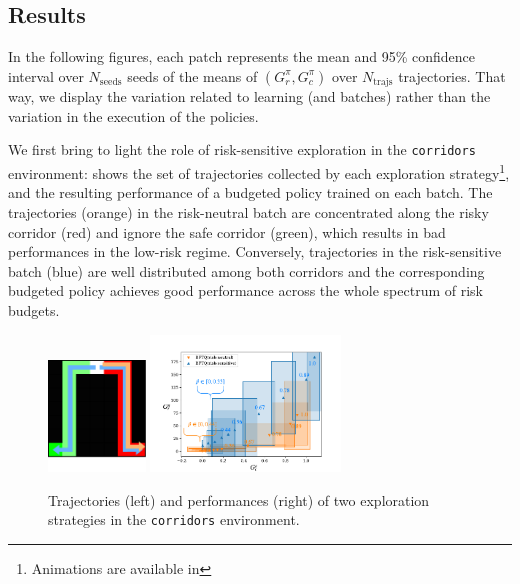 \documentclass{article}
\begin{document}
\subsection{Results}
\label{subsec:results}
In the following figures, each patch represents the mean and 95\% confidence interval over $N_{\text{seeds}}$ seeds of the means of $(G_r^\pi,G_c^\pi)$ over $N_\text{trajs}$ trajectories. That way, we display the variation related to learning (and batches) rather than the variation in the execution of the policies.

We first bring to light the role of risk-sensitive exploration in the \texttt{corridors} environment:  shows the set of trajectories collected by each exploration strategy\footnote{Animations are available in }, and the resulting performance of a budgeted policy trained on each batch. The trajectories (orange) in the risk-neutral batch are concentrated along the risky corridor (red) and ignore the safe corridor (green), which results in bad performances in the low-risk regime. Conversely, trajectories in the risk-sensitive batch (blue) are well distributed among both corridors and the corresponding budgeted policy achieves good performance across the whole spectrum of risk budgets.

\begin{figure}[tp]
    \centering
    \includegraphics[width=0.23\textwidth]{source/img/test.pdf}
    \includegraphics[page=1, width=0.45\textwidth]{source/img/corridors}
    \caption{Trajectories (left) and performances (right) of two exploration strategies in the \texttt{corridors} environment. }
    \label{fig:exploration}
\end{figure}
\end{document}
